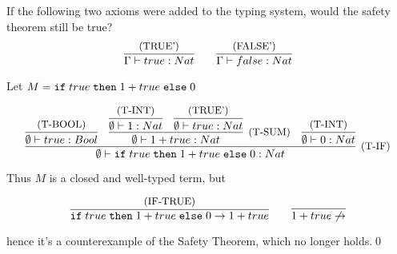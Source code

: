 \subsection{}

If the following two axioms were added to the typing system, would the safety
theorem still be true?
\[
	\infer{\Gamma \vdash true: Nat}{\text{\small{(TRUE')}}}
  \qquad
	\infer{\Gamma \vdash false: Nat}{\text{\small{(FALSE')}}}
\]

Let $M = \texttt{if}\;true\;\texttt{then}\;1+true\;\texttt{else}\;0$

\[
  \infer[\text{\small{(T-IF)}}]
  {\emptyset \vdash \IF{true}{1+true}{0}: Nat}
  {
    \infer{\emptyset \vdash true: Bool}{\text{\small{(T-BOOL)}}} &
    \infer[\text{\small{(T-SUM)}}]{\emptyset \vdash 1+true: Nat}{
      \infer{\emptyset \vdash 1: Nat}{\text{\small{(T-INT)}}} &
      \infer{\emptyset \vdash true: Nat}{\text{\small{(TRUE')}}}
    } &
    \infer{\emptyset \vdash 0: Nat}{\text{\small{(T-INT)}}}
  }
\]

Thus $M$ is a closed and well-typed term, but

\[
  \infer{\IF{true}{\SUM{1}{true}}{0} \to \SUM{1}{true}}{\text{\small{(IF-TRUE)}}}
  \qquad
  \infer{\SUM{1}{true} \not\to}{}
\]

hence it's a counterexample of the Safety Theorem, which no longer holds.\qed
